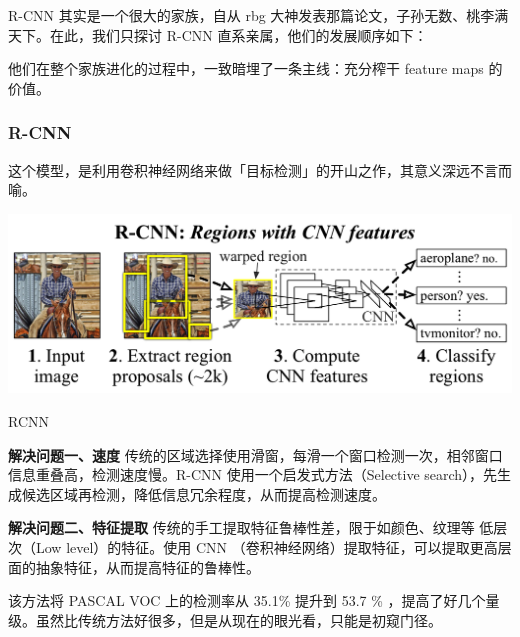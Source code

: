 R-CNN 其实是一个很大的家族，自从 rbg 大神发表那篇论文，子孙无数、桃李满天下。在此，我们只探讨 R-CNN 直系亲属，他们的发展顺序如下：

\vspace{10pt}


他们在整个家族进化的过程中，一致暗埋了一条主线：充分榨干 feature maps 的价值。

\subsubsection{R-CNN}
这个模型，是利用卷积神经网络来做「目标检测」的开山之作，其意义深远不言而喻。
\begin{uscfigure}
	\includegraphics[width=\textwidth]{./Pictures/rcnn-regions_with_cnn_features.png}	
	\caption{RCNN}
\end{uscfigure}

\textbf{解决问题一、速度}
传统的区域选择使用滑窗，每滑一个窗口检测一次，相邻窗口信息重叠高，检测速度慢。R-CNN 使用一个启发式方法（Selective search），先生成候选区域再检测，降低信息冗余程度，从而提高检测速度。

\textbf{解决问题二、特征提取}
传统的手工提取特征鲁棒性差，限于如颜色、纹理等 低层次（Low level）的特征。使用 CNN （卷积神经网络）提取特征，可以提取更高层面的抽象特征，从而提高特征的鲁棒性。

该方法将 PASCAL VOC 上的检测率从 35.1\% 提升到 53.7 \% ，提高了好几个量级。虽然比传统方法好很多，但是从现在的眼光看，只能是初窥门径。


